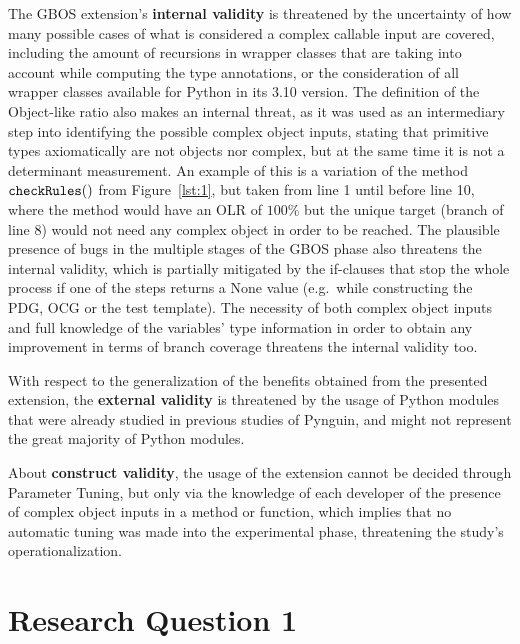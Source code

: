 \documentclass[%
  chapterprefix=false,%
  open=right,%
  twoside=true,%
  paper=a4,%
  logofile={Figures/logo.png},%
  thesistype=master,%
  UKenglish,%
]{se2thesis}
\newcommand{\callable}[2][]{\(\text{\texttt{#2}}(#1)\)}
\begin{document}
The GBOS extension's \textbf{internal validity} is threatened by the uncertainty of how many possible cases of what is considered a complex callable input are covered, including the amount of recursions in wrapper classes that are taking into account while computing the type annotations, or the consideration of all wrapper classes available for Python in its 3.10 version.
The definition of the Object-like ratio also makes an internal threat, as it was used as an intermediary step into identifying the possible complex object inputs, stating that primitive types axiomatically are not objects nor complex, but at the same time it is not a determinant measurement.
An example of this is a variation of the method \callable[]{checkRules} from Figure~\ref{lst:1}, but taken from line 1 until before line 10, where the method would have an OLR of \(100\%\) but the unique target (branch of line 8) would not need any complex object in order to be reached.
The plausible presence of bugs in the multiple stages of the GBOS phase also threatens the internal validity, which is partially mitigated by the if-clauses that stop the whole process if one of the steps returns a None value (e.g.\ while constructing the PDG, OCG or the test template).
The necessity of both complex object inputs and full knowledge of the variables' type information in order to obtain any improvement in terms of branch coverage threatens the internal validity too.

With respect to the generalization of the benefits obtained from the presented extension, the \textbf{external validity} is threatened by the usage of Python modules that were already studied in previous studies of Pynguin, and might not represent the great majority of Python modules. 

About \textbf{construct validity}, the usage of the extension cannot be decided through Parameter Tuning, but only via the knowledge of each developer of the presence of complex object inputs in a method or function, which implies that no automatic tuning was made into the experimental phase, threatening the study's operationalization.


\section{Research Question 1}
\end{document}
